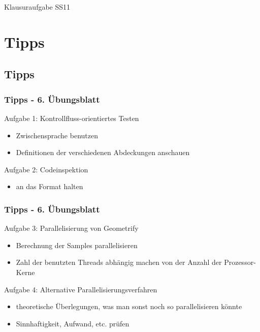 \documentclass[18pt]{beamer}
\begin{document}
		
	\begin{frame}
		\centering
		\begin{huge}
			Klausuraufgabe SS11
		\end{huge}
	\end{frame}


\section{Tipps}
	\subsection{Tipps}
	\begin{frame}
		\frametitle{Tipps - 6. Übungsblatt}
		\begin{exampleblock}{Aufgabe 1: Kontrollfluss-orientiertes Testen}
			\begin{itemize}
				\item Zwischensprache benutzen
				\item Definitionen der verschiedenen Abdeckungen anschauen
			\end{itemize}
		\end{exampleblock}
		\pause
		\begin{exampleblock}{Aufgabe 2: Codeinspektion} 
			\begin{itemize}
				\item an das Format halten
			\end{itemize}
		\end{exampleblock}
	\end{frame}

	\begin{frame}
		\frametitle{Tipps - 6. Übungsblatt}
		\begin{exampleblock}{Aufgabe 3: Parallelisierung von Geometrify}
			\begin{itemize}
				\item Berechnung der Samples parallelisieren
				\item Zahl der benutzten Threads abhängig machen von der Anzahl der Prozessor-Kerne
			\end{itemize}
		\end{exampleblock}
		\pause
		\begin{exampleblock}{Aufgabe 4: Alternative Parallelisierungsverfahren}
			\begin{itemize}
				\item theoretische Überlegungen, was man sonst noch so parallelisieren könnte
				\item Sinnhaftigkeit, Aufwand, etc. prüfen
			\end{itemize}
		\end{exampleblock}
	\end{frame}
\end{document}
